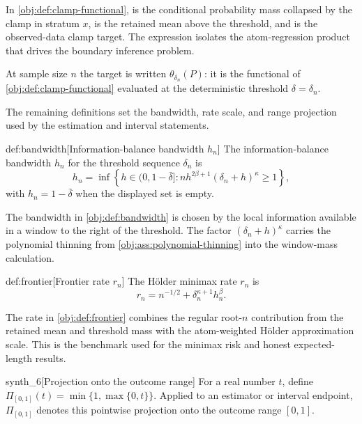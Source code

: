 \documentclass[11pt]{article}
\begin{document}
In \cref{obj:def:clamp-functional},  is the conditional probability mass collapsed by the clamp in stratum \(x\),  is the retained mean above the threshold, and  is the observed-data clamp target. The expression isolates the atom-regression product that drives the boundary inference problem.

At sample size \(n\) the target is written \(\theta_{\delta_n}(P)\): it is the functional of \cref{obj:def:clamp-functional} evaluated at the deterministic threshold \(\delta=\delta_n\).

The remaining definitions set the bandwidth, rate scale, and range projection used by the estimation and interval statements.

\begin{definitionv}{def:bandwidth}[Information-balance bandwidth \(h_n\)]
The information-balance bandwidth \(h_n\) for the threshold sequence \(\delta_n\) is
\[
h_n
=
\inf\left\{
h\in(0,1-\bar\delta]:
n h^{2\beta+1}(\delta_n+h)^\kappa\geq 1
\right\},
\]
with \(h_n=1-\bar\delta\) when the displayed set is empty.
\end{definitionv}

The bandwidth  in \cref{obj:def:bandwidth} is chosen by the local information available in a window to the right of the threshold. The factor \((\delta_n+h)^\kappa\) carries the polynomial thinning from \cref{obj:ass:polynomial-thinning} into the window-mass calculation.

\begin{definitionv}{def:frontier}[Frontier rate \(r_n\)]
The Hölder minimax rate \(r_n\) is
\[
r_n=n^{-1/2}+\delta_n^{\kappa+1}h_n^\beta .
\]
\end{definitionv}

The rate  in \cref{obj:def:frontier} combines the regular root-\(n\) contribution from the retained mean and threshold mass with the atom-weighted Hölder approximation scale. This is the benchmark used for the minimax risk and honest expected-length results.

\begin{definitionv}{synth_6}[Projection onto the outcome range]
For a real number \(t\), define \(\Pi_{[0,1]}(t)=\min\{1,\max\{0,t\}\}\). Applied to an estimator or interval endpoint, \(\Pi_{[0,1]}\) denotes this pointwise projection onto the outcome range \([0,1]\).
\end{definitionv}
\end{document}
